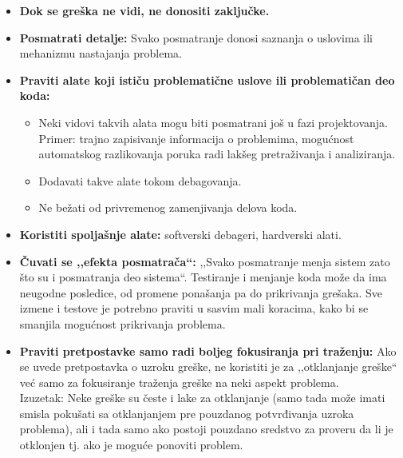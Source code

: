 \documentclass[a4paper]{article}
\begin{document}
  \begin{itemize}
    \item \textbf{Dok se greška ne vidi, ne donositi zaključke.}
    \item \textbf{Posmatrati detalje:} Svako posmatranje donosi saznanja o uslovima ili mehanizmu
          nastajanja problema.
    \item \textbf{Praviti alate koji ističu problematične uslove ili problematičan deo koda:}
          \begin{itemize}
            \item Neki vidovi takvih alata mogu biti posmatrani još u fazi projektovanja. Primer:
                  trajno zapisivanje informacija o problemima, mogućnost automatskog razlikovanja
                  poruka radi lakšeg pretraživanja i analiziranja.  
            \item Dodavati takve alate tokom debagovanja.
            \item Ne bežati od privremenog zamenjivanja delova koda.
          \end{itemize}
    \item \textbf{Koristiti spoljašnje alate:} softverski debageri, hardverski alati.
    \item \textbf{Čuvati se ,,efekta posmatrača``:} ,,Svako posmatranje menja sistem zato što su
          i posmatranja deo sistema``. Testiranje i menjanje koda može da ima neugodne posledice,
          od promene ponašanja pa do prikrivanja grešaka. Sve izmene i testove je potrebno
          praviti u sasvim mali koracima, kako bi se smanjila mogućnost prikrivanja problema.
    \item \textbf{Praviti pretpostavke samo radi boljeg fokusiranja pri traženju:} Ako se uvede
          pretpostavka o uzroku greške, ne koristiti je za ,,otklanjanje greške`` već 
          samo za fokusiranje traženja greške na neki aspekt problema. \\
          Izuzetak: Neke greške su česte i lake za otklanjanje (samo tada može imati smisla
          pokušati sa otklanjanjem pre pouzdanog potvrđivanja uzroka problema), ali i tada
          samo ako postoji pouzdano sredstvo za proveru da li je otklonjen tj. ako je
          moguće ponoviti problem.
  \end{itemize}
\end{document}
